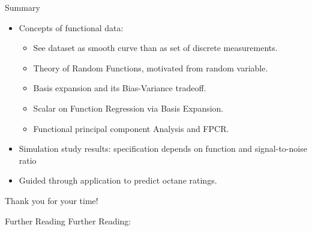 \documentclass{beamer}
\begin{document}
	\begin{frame}{Summary}
		\begin{itemize}
		\item
    		Concepts of functional data: 
    		\begin{itemize}
			\item See dataset as smooth curve than as set of discrete measurements.
    			\item Theory of Random Functions, motivated from random variable.
    			\item Basis expansion and its Bias-Variance tradeoff.
    			\item Scalar on Function Regression via Basis Expansion.
    			\item Functional principal component Analysis and FPCR.
		\end{itemize}
    		\item
    		Simulation study results: specification depends on function and signal-to-noise ratio
    		\item
    		Guided through application to predict octane ratings.
    		
		\end{itemize}
	\end{frame}
	
	\begin{frame}
		\vspace*{\fill}
		\begin{center}
			{\LARGE Thank you for your time!}
		\end{center}	
		\vspace*{\fill}
	\end{frame}
	
	\begin{frame}{Further Reading}
		 Further Reading:
		 \nocite{Bohacs_Ovadi_Salgo1998}
		 \nocite{FR_li_et_al_2020} 
		 \nocite{Reiss_2007b}
		 \AtNextBibliography{\tiny}
		 \printbibliography[heading=none]
	\end{frame}
	
	
\end{document}
